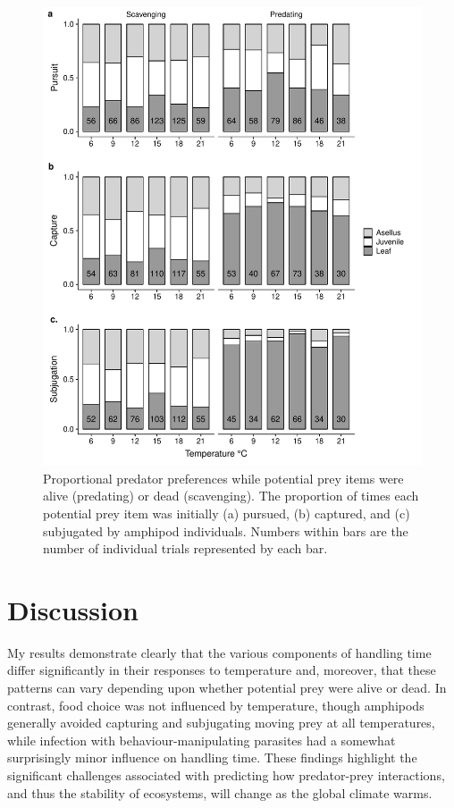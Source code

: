 \begin{figure}[H]
    \centering
    \includegraphics[keepaspectratio,width=\textwidth]{figures/ch4/feedpref_numb.pdf}
  \caption [Proportional predator preferences while potential prey items were alive (predating) or dead (scavenging).]{Proportional predator preferences while potential prey items were alive (predating) or dead (scavenging). The proportion of times each potential prey item was initially (a) pursued, (b) captured, and (c) subjugated by amphipod individuals. Numbers within bars are the number of individual trials represented by each bar.} 
    \label{fig:feedpref}
\end{figure}

\section{Discussion}

My results demonstrate clearly that the various components of handling time differ significantly in their responses to temperature and, moreover, that these patterns can vary depending upon whether potential prey were alive or dead. In contrast, food choice was not influenced by temperature, though amphipods generally avoided capturing and subjugating moving prey at all temperatures, while infection with behaviour-manipulating parasites had a somewhat surprisingly minor influence on handling time. These findings highlight the significant challenges associated with predicting how predator-prey interactions, and thus the stability of ecosystems, will change as the global climate warms.

